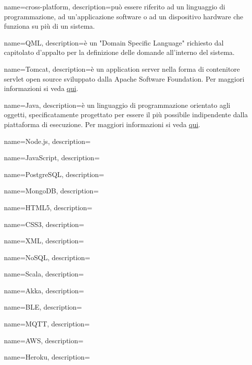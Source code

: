  {
	name=cross-platform,
	description={può essere riferito ad un linguaggio di programmazione, ad un'applicazione software o ad un dispositivo hardware che funziona su più di un sistema.}
}

 {
	name=QML,
	description={è un "Domain Specific Language" richiesto dal capitolato d'appalto per la definizione delle domande all'interno del sistema.}
}

 {
	name=Tomcat,
	description={è un application server nella forma di contenitore servlet open source sviluppato dalla Apache Software Foundation. Per maggiori informazioni si veda \href{https://it.wikipedia.org/wiki/Apache_Tomcat}{qui}.}
}

 {
	name=Java,
	description={è un linguaggio di programmazione orientato agli oggetti, specificatamente progettato per essere il più possibile indipendente dalla piattaforma di esecuzione. Per maggiori informazioni si veda \href{https://it.wikipedia.org/wiki/Java_(linguaggio_di_programmazione)}{qui}.}
}

 {
	name=Node.js,
	description={\TODO{}}
}

 {
	name=JavaScript,
	description={\TODO{}}
}

 {
	name=PostgreSQL,
	description={\TODO{}}
}

 {
	name=MongoDB,
	description={\TODO{}}
}

 {
	name=HTML5,
	description={\TODO{}}
}

 {
	name=CSS3,
	description={\TODO{}}
}

 {
	name=XML,
	description={\TODO{}}
}

 {
	name=NoSQL,
	description={\TODO{}}
}

 {
	name=Scala,
	description={\TODO{}}
}

 {
	name=Akka,
	description={\TODO{}}
}

 {
	name=BLE,
	description={\TODO{}}
}

 {
	name=MQTT,
	description={\TODO{}}
}

 {
	name=AWS,
	description={\TODO{}}
}

 {
	name=Heroku,
	description={\TODO{}}
}

